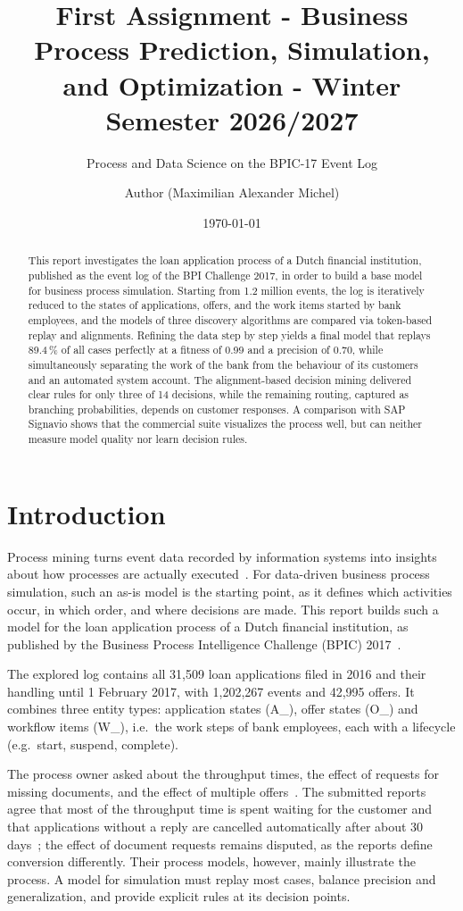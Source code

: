 \documentclass[
  english,        %
  font=times,     %
  twocolumn,      %
]{tumarticle}
\title{First Assignment - Business Process Prediction, Simulation, and Optimization - Winter Semester 2026/2027}
\subtitle{Process and Data Science on the BPIC-17 Event Log}
\author[email=maximilian.michel@tum.de]{Author (Maximilian Alexander Michel)}
\date\today
\begin{document}
\maketitle

\begin{abstract}
This report investigates the loan application process of a Dutch financial institution, published as the event log of the BPI Challenge 2017, in order to build a base model for business process simulation. Starting from 1.2 million events, the log is iteratively reduced to the states of applications, offers, and the work items started by bank employees, and the models of three discovery algorithms are compared via token-based replay and alignments. Refining the data step by step yields a final model that replays 89.4\,\% of all cases perfectly at a fitness of 0.99 and a precision of 0.70, while simultaneously separating the work of the bank from the behaviour of its customers and an automated system account. The alignment-based decision mining delivered clear rules for only three of 14 decisions, while the remaining routing, captured as branching probabilities, depends on customer responses. A comparison with SAP Signavio shows that the commercial suite visualizes the process well, but can neither measure model quality nor learn decision rules. 
\end{abstract}
%

\section{Introduction}
Process mining turns event data recorded by information systems into insights about how processes are actually executed~\cite{vanderaalst2016}. For data-driven business process simulation, such an as-is model is the starting point, as it defines which activities occur, in which order, and where decisions are made. This report builds such a model for the loan application process of a Dutch financial institution, as published by the Business Process Intelligence Challenge (BPIC) 2017~\cite{bpic17_data}. 

The explored log contains all 31,509 loan applications filed in 2016 and their handling until 1 February 2017, with 1,202,267 events and 42,995 offers. It combines three entity types: application states (A\_), offer states (O\_) and workflow items (W\_), i.e.\ the work steps of bank employees, each with a lifecycle (e.g.\ start, suspend, complete). 

The process owner asked about the throughput times, the effect of requests for missing documents, and the effect of multiple offers~\cite{bpic17_challenge}. The submitted reports agree that most of the throughput time is spent waiting for the customer and that applications without a reply are cancelled automatically after about 30 days~\cite{smith2017axis,scheithauer2017metafinanz,povalyaeva2017density}; the effect of document requests remains disputed, as the reports define conversion differently. Their process models, however, mainly illustrate the process. A model for simulation must replay most cases, balance precision and generalization, and provide explicit rules at its decision points.
\end{document}

